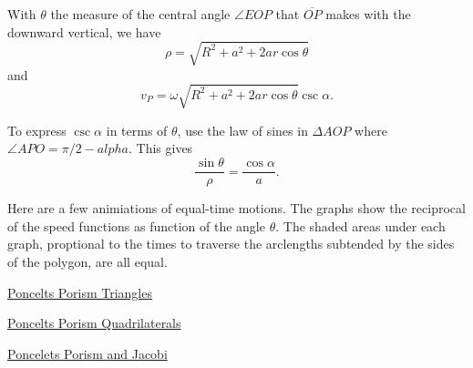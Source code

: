 \documentclass{ximera}
\begin{document}



With $\theta$ the measure of the central angle $\angle EOP$ that $\overline{OP}$ makes with the downward vertical, we have
\[
  \rho = \sqrt{R^2 + a^2 + 2ar \cos \theta}
\]
and 
\[
    v_P = \omega \sqrt{R^2 + a^2 + 2ar \cos \theta} \csc \alpha .
\]

To express $\csc\alpha$ in terms of $\theta$, use the law of sines in $\Delta AOP$ where $\angle APO = \pi/2 - alpha$. This gives
\[
    \frac{\sin\theta}{\rho} = \frac{\cos\alpha}{a}.
\]

\fi

Here are a few animiations of equal-time motions. The graphs show the reciprocal of the speed functions as function of the angle $\theta$. The shaded areas under each graph, proptional to the times to traverse the arclengths subtended by the sides of the polygon, are all equal.

\begin{exploration}

\begin{onlineOnly}
    \begin{center}
\end{center}
\end{onlineOnly}

\href{https://www.desmos.com/calculator/0aihemcv0o}{Poncelts Porism Triangles}

\end{exploration}


\begin{exploration}

\begin{onlineOnly}
    \begin{center}
\end{center}
\end{onlineOnly}

\href{https://www.desmos.com/calculator/pua4ogjcmr}{Poncelts Porism Quadrilaterals}


\end{exploration}


\begin{exploration}
\begin{onlineOnly}
    \begin{center}
\end{center}
\end{onlineOnly}

\href{https://www.desmos.com/calculator/lwbypn9rje}{Poncelets Porism and Jacobi}

\end{exploration}
\end{document}
